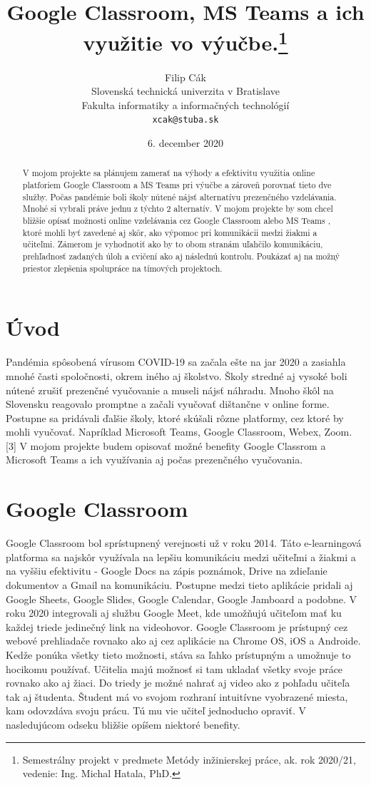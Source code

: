\documentclass[10pt,slovak,a4paper]{article}
\title{Google Classroom,  MS Teams a ich využitie vo výučbe.\thanks{Semestrálny projekt v predmete Metódy inžinierskej práce, ak. rok 2020/21, vedenie: Ing. Michal Hatala, PhD. }}
\author{Filip Cák\\[2pt]
	{\small Slovenská technická univerzita v Bratislave}\\
	{\small Fakulta informatiky a informačných technológií}\\
	{\small \texttt{xcak@stuba.sk}}
	}
\date{\small 6. december 2020}
\begin{document}
\maketitle

\begin{abstract}
V mojom projekte sa plánujem zamerať na výhody a efektivitu využitia online platforiem Google Classroom a MS Teams pri výučbe a zároveň porovnať tieto dve služby. Počas pandémie boli školy nútené nájsť alternatívu prezenčného vzdelávania. Mnohé si vybrali práve jednu z týchto 2 alternatív. \cite {COVID-19clanok} V mojom projekte by som chcel bližšie opísať možnosti online vzdelávania cez Google Classroom alebo MS Teams \cite {porovnanie}, ktoré mohli byť zavedené aj skôr, ako výpomoc pri komunikácii medzi žiakmi a učiteľmi. Zámerom je vyhodnotiť ako by to obom stranám uľahčilo komunikáciu, prehľadnosť zadaných úloh a cvičení ako aj následnú kontrolu. Poukázať aj na možný priestor zlepšenia spolupráce na tímových projektoch.
\end{abstract}



\section{Úvod}
Pandémia spôsobená vírusom COVID-19 sa začala ešte na jar 2020 a zasiahla mnohé časti spoločnosti, okrem iného aj školstvo. Školy stredné aj vysoké boli nútené zrušiť prezenčné vyučovanie a museli nájsť náhradu. Mnoho škôl na Slovensku reagovalo promptne a začali vyučovať dištančne v online forme. Postupne sa pridávali ďalšie školy, ktoré skúšali rôzne platformy, cez ktoré by mohli vyučovať. Napríklad Microsoft Teams, Google Classroom, Webex, Zoom. [3] V mojom projekte budem opisovať možné benefity Google Classrom a Microsoft Teams a ich využívania aj počas prezenčného vyučovania. 

\section{Google Classroom} \label{Google Classroom}

Google Classroom bol sprístupnený verejnosti už v roku 2014. \cite {release_date} Táto e-learningová platforma sa najskôr využívala na lepšiu komunikáciu medzi učiteľmi a žiakmi a na vyššiu efektivitu - Google Docs na zápis poznámok, Drive na zdieľanie dokumentov a Gmail na komunikáciu. Postupne medzi tieto aplikácie pridali aj Google Sheets, Google Slides, Google Calendar, Google Jamboard a podobne. V roku 2020 integrovali aj službu Google Meet, kde umožňujú učiteľom mať ku každej triede jedinečný link na videohovor. Google Classroom je prístupný cez webové prehliadače rovnako ako aj cez aplikácie na Chrome OS, iOS a Androide. Kedže ponúka všetky tieto možnosti, stáva sa ľahko prístupným a umožnuje to hocikomu používať. \cite {COVID-19clanok} Učitelia majú možnosť si tam ukladať všetky svoje práce rovnako ako aj žiaci. Do triedy je možné nahrať aj video ako z pohľadu učiteľa tak aj študenta. Študent má vo svojom rozhraní intuitívne vyobrazené miesta, kam odovzdáva svoju prácu. Tú mu vie učiteľ jednoducho opraviť. V nasledujúcom odseku bližšie opíšem niektoré benefity.
\end{document}

